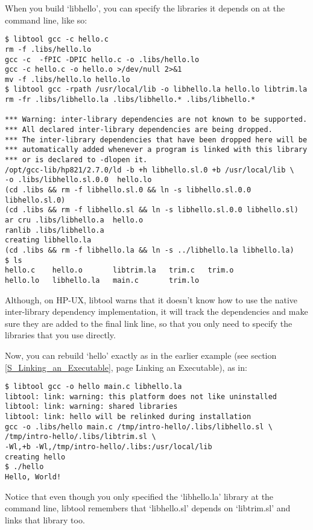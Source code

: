 When you build `libhello', you can specify the libraries it depends on at the command line, like so: 

\begin{Verbatim}
$ libtool gcc -c hello.c
rm -f .libs/hello.lo
gcc -c  -fPIC -DPIC hello.c -o .libs/hello.lo
gcc -c hello.c -o hello.o >/dev/null 2>&1
mv -f .libs/hello.lo hello.lo
$ libtool gcc -rpath /usr/local/lib -o libhello.la hello.lo libtrim.la
rm -fr .libs/libhello.la .libs/libhello.* .libs/libhello.*

*** Warning: inter-library dependencies are not known to be supported.
*** All declared inter-library dependencies are being dropped.
*** The inter-library dependencies that have been dropped here will be
*** automatically added whenever a program is linked with this library
*** or is declared to -dlopen it.
/opt/gcc-lib/hp821/2.7.0/ld -b +h libhello.sl.0 +b /usr/local/lib \
-o .libs/libhello.sl.0.0  hello.lo
(cd .libs && rm -f libhello.sl.0 && ln -s libhello.sl.0.0 libhello.sl.0)
(cd .libs && rm -f libhello.sl && ln -s libhello.sl.0.0 libhello.sl)
ar cru .libs/libhello.a  hello.o
ranlib .libs/libhello.a
creating libhello.la
(cd .libs && rm -f libhello.la && ln -s ../libhello.la libhello.la)
$ ls
hello.c    hello.o       libtrim.la   trim.c   trim.o
hello.lo   libhello.la   main.c       trim.lo
\end{Verbatim}

Although, on HP-UX, libtool warns that it doesn't know how to use the native inter-library dependency implementation, it will track the dependencies and make sure they are added to the final link line, so that you only need to specify the libraries that you use directly. 


Now, you can rebuild `hello' exactly as in the earlier example (see 
section \ref{S_Linking_an_Executable}, page \pageref{S_Linking_an_Executable}
Linking an Executable), as in: 

\begin{Verbatim}
$ libtool gcc -o hello main.c libhello.la
libtool: link: warning: this platform does not like uninstalled
libtool: link: warning: shared libraries
libtool: link: hello will be relinked during installation
gcc -o .libs/hello main.c /tmp/intro-hello/.libs/libhello.sl \
/tmp/intro-hello/.libs/libtrim.sl \
-Wl,+b -Wl,/tmp/intro-hello/.libs:/usr/local/lib
creating hello
$ ./hello
Hello, World!
\end{Verbatim}

Notice that even though you only specified the `libhello.la' library at the command line, libtool remembers that `libhello.sl' depends on `libtrim.sl' and links that library too. 


